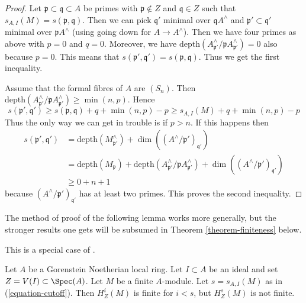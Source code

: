 \begin{proof}
\medskip\noindent
Let $\mathfrak p \subset \mathfrak q \subset A$ be primes
with $\mathfrak p \not \in Z$ and $\mathfrak q \in Z$ such that
$s_{A, I}(M) = s(\mathfrak p, \mathfrak q)$.
Then we can pick $\mathfrak q'$ minimal over $\mathfrak q A^\wedge$
and $\mathfrak p' \subset \mathfrak q'$ minimal over
$\mathfrak p A^\wedge$ (using going down for $A \to A^\wedge$).
Then we have four primes as above with $p = 0$ and $q = 0$.
Moreover, we have
$\text{depth}(A^\wedge_{\mathfrak p'} / \mathfrak p A^\wedge_{\mathfrak p'})=0$
also because $p = 0$. This means that
$s(\mathfrak p', \mathfrak q') = s(\mathfrak p, \mathfrak q)$.
Thus we get the first inequality.

\medskip\noindent
Assume that the formal fibres of $A$ are $(S_n)$. Then
$\text{depth}(A^\wedge_{\mathfrak p'} / \mathfrak p A^\wedge_{\mathfrak p'})
\geq \min(n, p)$.
Hence
$$
s(\mathfrak p', \mathfrak q') \geq
s(\mathfrak p, \mathfrak q) + q + \min(n, p) - p \geq
s_{A, I}(M) + q + \min(n, p) - p
$$
Thus the only way we can get in trouble is if $p > n$. If this happens
then
\begin{align*}
s(\mathfrak p', \mathfrak q')
& =
\text{depth}(M^\wedge_{\mathfrak p'}) +
\dim((A^\wedge/\mathfrak p')_{\mathfrak q'}) \\
& =
\text{depth}(M_\mathfrak p) +
\text{depth}(A^\wedge_{\mathfrak p'} / \mathfrak p A^\wedge_{\mathfrak p'}) +
\dim((A^\wedge/\mathfrak p')_{\mathfrak q'}) \\
& \geq
0 + n + 1
\end{align*}
because $(A^\wedge/\mathfrak p')_{\mathfrak q'}$ has at least two primes.
This proves the second inequality.
\end{proof}

\noindent
The method of proof of the following lemma works more generally,
but the stronger results one gets will be subsumed in
Theorem \ref{theorem-finiteness} below.

\begin{lemma}
\label{lemma-local-annihilator}
\begin{reference}
This is a special case of
\cite[Satz 1]{Faltings-annulators}.
\end{reference}
Let $A$ be a Gorenstein Noetherian local ring. Let $I \subset A$
be an ideal and set $Z = V(I) \subset \Spec(A)$.
Let $M$ be a finite $A$-module. Let $s = s_{A, I}(M)$ as in
(\ref{equation-cutoff}). Then $H^i_Z(M)$ is finite for $i < s$,
but $H^s_Z(M)$ is not finite.
\end{lemma}

